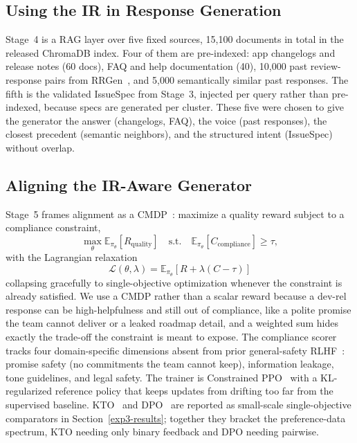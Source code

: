 \documentclass[sigconf, anonymous]{acmart}
\begin{document}
\subsection{Using the IR in Response Generation}\label{aim2}

Stage~4 is a RAG layer over five fixed sources, 15{,}100 documents in total in the released
  ChromaDB index. Four of them are pre-indexed: app changelogs and release notes (60 docs), FAQ
  and help documentation (40), 10{,}000 past review-response pairs from
  RRGen~\cite{gao2019automating}, and 5{,}000 semantically similar past responses. The fifth is the
  validated IssueSpec from Stage~3, injected per query rather than pre-indexed, because specs
  are generated per cluster. These five were chosen to give the generator the answer (changelogs, FAQ), the voice (past responses), the closest precedent (semantic neighbors), and the structured intent (IssueSpec) without overlap.
  
\subsection{Aligning the IR-Aware Generator}\label{aim3}

Stage~5 frames alignment as a CMDP~\cite{altman2021constrained, dai2024safe}:
  maximize a quality reward subject to a compliance constraint,
  \[
  \max_\theta \mathbb{E}_{\pi_\theta}[R_{\text{quality}}] \quad
  \text{s.t.} \quad \mathbb{E}_{\pi_\theta}[C_{\text{compliance}}] \ge
  \tau,
  \] 
  with the Lagrangian relaxation
  \[
  \mathcal{L}(\theta,\lambda) = \mathbb{E}_{\pi_\theta}[R + \lambda(C -
  \tau)]
  \]
  collapsing gracefully to single-objective optimization whenever the
  constraint is already satisfied. We use a CMDP rather than a scalar
  reward because a dev-rel response can be high-helpfulness and still
  out of compliance, like a polite promise the team cannot deliver or a
  leaked roadmap detail, and a weighted sum hides exactly the trade-off
  the constraint is meant to expose. The compliance scorer tracks four
  domain-specific dimensions absent from prior general-safety
  RLHF~\cite{dai2024safe}: promise safety (no commitments the team cannot
  keep), information leakage, tone guidelines, and legal safety. The
  trainer is Constrained PPO~\cite{schulman2017proximal, dai2024safe} with a
  KL-regularized reference policy that keeps updates from drifting too
  far from the supervised baseline.
  KTO~\cite{ethayarajh2024kto} and DPO~\cite{rafailov2023direct} are reported as
  small-scale single-objective comparators in
  Section~\ref{exp3-results}; together they bracket the preference-data
  spectrum, KTO needing only binary feedback and DPO needing pairwise.
\end{document}
